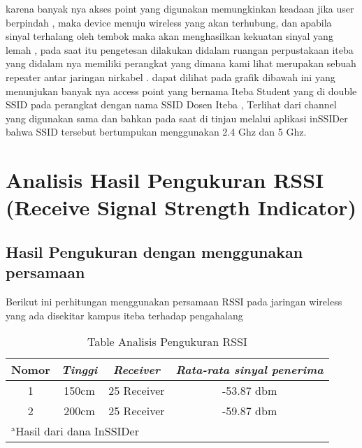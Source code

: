 \documentclass[conference]{IEEEtran}
\begin{document}
karena banyak nya akses point yang digunakan memungkinkan keadaan jika user berpindah , maka device menuju wireless yang akan terhubung,
dan apabila sinyal terhalang oleh tembok maka akan menghasilkan kekuatan sinyal yang lemah , pada saat itu pengetesan dilakukan didalam ruangan
perpustakaan iteba yang didalam nya memiliki perangkat yang dimana kami lihat merupakan sebuah repeater antar jaringan nirkabel .
dapat dilihat pada grafik dibawah ini yang menunjukan banyak nya access point yang bernama Iteba Student yang di double SSID pada perangkat dengan nama SSID
Dosen Iteba , Terlihat dari channel yang digunakan sama dan bahkan pada saat di tinjau melalui aplikasi inSSIDer bahwa SSID tersebut bertumpukan menggunakan 2.4 Ghz dan 5 Ghz.~\cite{arnomoanalisis}



\section{Analisis Hasil Pengukuran RSSI (Receive
Signal Strength Indicator)}
\subsection{Hasil Pengukuran dengan menggunakan persamaan}
Berikut ini perhitungan menggunakan persamaan RSSI pada jaringan wireless yang ada disekitar kampus iteba terhadap pengahalang



\begin{table}[htbp]
    \caption{Table Analisis Pengukuran RSSI}
    \begin{center}
    \begin{tabular}{|c|c|c|c|}
        \hline
    \textbf{Nomor} & \textbf{\textit{Tinggi}}& \textbf{\textit{Receiver}}& \textbf{\textit{Rata-rata sinyal penerima}} \\
    \hline
    1 & 150cm& 25 Receiver & -53.87 dbm  \\
    \hline
    2 & 200cm& 25 Receiver & -59.87 dbm  \\
    \hline
    \multicolumn{4}{l}{$^{\mathrm{a}}$Hasil dari dana InSSIDer}
    \end{tabular}
    \label{tab1}
    \end{center}
    \end{table}
\end{document}
